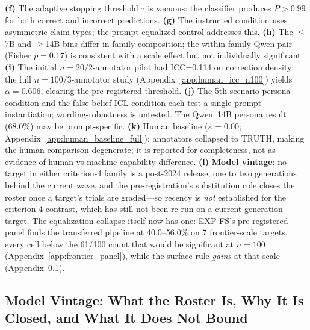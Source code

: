 \textbf{(f)} The adaptive stopping threshold $\tau$ is vacuous: the classifier produces $P>0.99$ for both correct and incorrect predictions. \textbf{(g)} The instructed condition uses asymmetric claim types; the prompt-equalized control addresses this. \textbf{(h)} The $\leq$7B and $\geq$14B bins differ in family composition; the within-family Qwen pair (Fisher $p=0.17$) is consistent with a scale effect but not individually significant. \textbf{(i)} The initial $n=20$/2-annotator pilot had ICC=0.114 on correction density; the full $n=100$/3-annotator study (Appendix~\ref{app:human_icc_n100}) yields $\alpha=0.606$, clearing the pre-registered threshold. \textbf{(j)} The 5th-scenario persona condition and the false-belief-ICL condition each test a single prompt instantiation; wording-robustness is untested. The Qwen~14B persona result (68.0\%) may be prompt-specific. \textbf{(k)} Human baseline ($\kappa=0.00$; Appendix~\ref{app:human_baseline_full}): annotators collapsed to TRUTH, making the human comparison degenerate; it is reported for completeness, not as evidence of human-vs-machine capability difference. \textbf{(l)} \textbf{Model vintage}: no target in either criterion-4 family is a post-2024 release, one to two generations behind the current wave, and the pre-registration's substitution rule closes the roster once a target's trials are graded---so recency is \emph{not} established for the criterion-4 contrast, which has still not been re-run on a current-generation target. The equalization collapse itself now has one: EXP-FS's pre-registered panel finds the transferred pipeline at 40.0--56.0\% on 7 frontier-scale targets, every cell below the 61/100 count that would be significant at $n\!=\!100$ (Appendix~\ref{app:frontier_panel}), while the surface rule \emph{gains} at that scale (Appendix~\ref{app:vintage}).

\subsection{Model Vintage: What the Roster Is, Why It Is Closed, and What It Does Not Bound}
\label{app:vintage}

